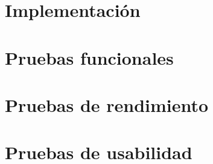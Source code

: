 \section{Implementación}

\section{Pruebas funcionales}

\section{Pruebas de rendimiento}

\section{Pruebas de usabilidad}